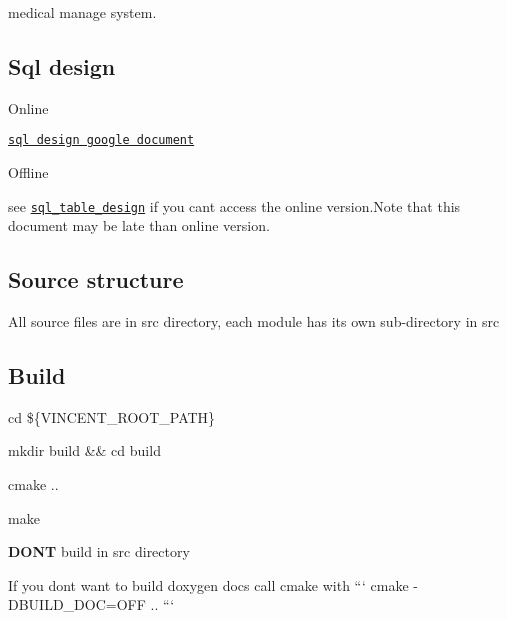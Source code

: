 medical manage system. \href{https://app.codacy.com/app/maidamai0/vincent?utm_source=github.com&utm_medium=referral&utm_content=advanced-data-processing-company/vincent&utm_campaign=Badge_Grade_Settings}{\tt } \href{https://travis-ci.org/advanced-data-processing-company/vincent}{\tt } \href{https://ci.appveyor.com/project/maidamai0/vincent}{\tt } \href{https://lgtm.com/projects/g/advanced-data-processing-company/vincent/alerts/}{\tt } \href{https://lgtm.com/projects/g/advanced-data-processing-company/vincent/context:javascript}{\tt }

\subsection*{Sql design}


\begin{DoxyItemize}
\item Online

\href{https://docs.google.com/document/d/1QlFliN9hr0bRWUpu1whWGgTl2qbUMroOrxDV7gtdL20/edit}{\tt sql design google document}
\item Offline

see \href{https://htmlpreview.github.io/?https://github.com/advanced-data-processing-company/vincent/blob/master/sql_table_design.html}{\tt sql\+\_\+table\+\_\+design} if you can\textquotesingle{}t access the online version.\+Note that this document may be late than online version. \subsection*{Source structure}
\end{DoxyItemize}

All source files are in {\ttfamily src} directory, each module has its own sub-\/directory in {\ttfamily src}

\subsection*{Build}


\begin{DoxyEnumerate}
\item {\ttfamily cd \$\{V\+I\+N\+C\+E\+N\+T\+\_\+\+R\+O\+O\+T\+\_\+\+P\+A\+TH\}}
\item {\ttfamily mkdir build \&\& cd build}
\item {\ttfamily cmake ..}
\item {\ttfamily make}
\end{DoxyEnumerate}
\begin{DoxyItemize}
\item {\bfseries D\+O\+NT} build in {\ttfamily src} directory
\item If you dont want to build {\ttfamily doxygen docs} call cmake with ``` cmake -\/\+D\+B\+U\+I\+L\+D\+\_\+\+D\+OC=O\+FF .. ```
\end{DoxyItemize}

